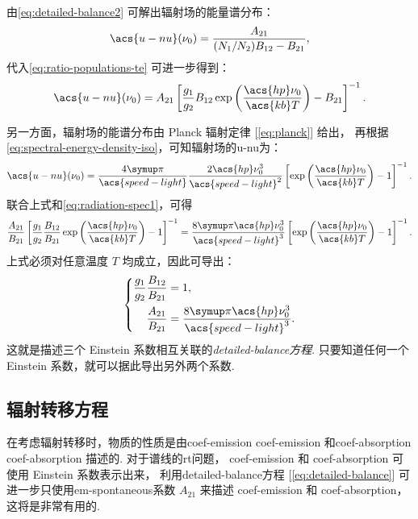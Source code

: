 由\autoref{eq:detailed-balance2} 可解出辐射场的能量谱分布：
\begin{equation}
  \acs{u-nu}(\nu_0) = \frac{A_{21}}{(N_1/N_2) B_{12} - B_{21}} ,
\end{equation}
代入\autoref{eq:ratio-populations-te} 可进一步得到：
\begin{equation}
  \label{eq:radiation-spec1}
  \acs{u-nu}(\nu_0) = A_{21} \left[ \frac{g_1}{g_2} B_{12}
    \exp\left( \frac{\acs{hp} \nu_0}{\acs{kb} T} \right)
    - B_{21} \right]^{-1} .
\end{equation}

另一方面，辐射场的能谱分布由 Planck 辐射定律 [\autoref{eq:planck}] 给出，
再根据\autoref{eq:spectral-energy-density-iso}，可知辐射场的\acl{u-nu}为：
\begin{equation}
  \label{eq:radiation-spec2}
  \acs{u-nu}(\nu_0) = \frac{4\Cpi}{\acs{speed-light}}
    \frac{2 \acs{hp} \nu_0^3}{\acs{speed-light}^2}
    \left[ \exp\left( \frac{\acs{hp} \nu_0}{\acs{kb} T} \right)
      - 1 \right]^{-1} .
\end{equation}
联合上式和\autoref{eq:radiation-spec1}，可得
\begin{equation}
  \frac{A_{21}}{B_{21}} \left[ \frac{g_1}{g_2} \frac{B_{12}}{B_{21}}
    \exp\left( \frac{\acs{hp} \nu_0}{\acs{kb} T} \right) - 1 \right]^{-1}
  = \frac{8\Cpi \acs{hp} \nu_0^3}{\acs{speed-light}^3}
    \left[ \exp\left( \frac{\acs{hp} \nu_0}{\acs{kb} T} \right)
      - 1 \right]^{-1} .
\end{equation}
上式必须对任意温度 $T$ 均成立，因此可导出：
\begin{equation}
  \label{eq:detailed-balance}
  \left\{
    \begin{aligned}
      \frac{g_1}{g_2} \frac{B_{12}}{B_{21}} & = 1 , \\
      \frac{A_{21}}{B_{21}} & =
        \frac{8\Cpi \acs{hp} \nu_0^3}{\acs{speed-light}^3} .
    \end{aligned}
  \right.
\end{equation}
这就是描述三个 Einstein 系数相互关联的\emph{\ac{detailed-balance}方程}.
只要知道任何一个 Einstein 系数，就可以据此导出另外两个系数.

\subsection{辐射转移方程}

在考虑辐射转移时，物质的性质是由\acl{coef-emission} \acs{coef-emission}
和\acl{coef-absorption} \acs{coef-absorption} 描述的.
对于谱线的\ac{rt}问题，
\acs{coef-emission} 和 \acs{coef-absorption} 可使用 Einstein 系数表示出来，
利用\ac{detailed-balance}方程 [\autoref{eq:detailed-balance}]
可进一步只使用\ac{em-spontaneous}系数 $A_{21}$
来描述 \acs{coef-emission} 和 \acs{coef-absorption}，
这将是非常有用的.

